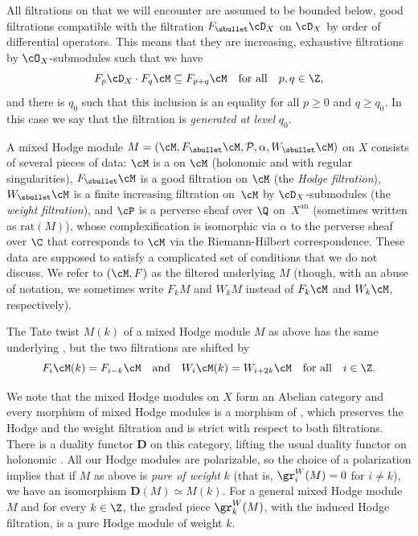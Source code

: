 All filtrations on \DXmodules that we will encounter are assumed to be bounded below, good filtrations compatible with the
filtration $F_{\sbullet}\cD_X$ on $\cD_X$ by order of differential operators. This means that they are increasing, exhaustive filtrations by $\cO_X$-submodules such that we have
\[F_p\cD_X\cdot F_q\cM\subseteq F_{p+q}\cM\quad\text{for all}\quad p,q\in\Z,\]
and there is $q_0$ such that this inclusion is an equality for all $p\geq 0$ and $q\geq q_0$. In this case we say that the filtration is \emph{generated at level} $q_0$.

A mixed Hodge module $M=(\cM, F_{\sbullet}\cM, {\mathcal P}, \alpha, W_{\sbullet}\cM)$ on $X$ consists of several pieces of data: $\cM$ is a \DXmodule on $\cM$ (holonomic and with regular singularities), $F_{\sbullet}\cM$ is a good filtration on $\cM$ (the \emph{Hodge filtration}), $W_{\sbullet}\cM$ is a finite increasing
filtration on~$\cM$ by $\cD_X$-submodules (the \emph{weight filtration}), and $\cP$
is a perverse sheaf over $\Q$ on~$X^\mathrm{an}$ (sometimes written as $\mathrm{rat}(M)$), whose complexification is isomorphic via $\alpha$ to the perverse sheaf over $\C$ that corresponds to $\cM$ via the
Riemann-Hilbert correspondence. These data are supposed to satisfy a complicated set of conditions that we do not discuss.
We refer to $(\cM,F)$ as the filtered \DXmodule underlying $M$ (though,
with an abuse of notation, we sometimes write $F_kM$ and $W_kM$ instead of $F_k\cM$ and $W_k\cM$, respectively).

The Tate twist $M(k)$ of a mixed Hodge module $M$ as above has the same underlying \DXmodule, but the two filtrations are shifted by
\[F_i\cM(k)=F_{i-k}\cM\quad\text{and}\quad W_i\cM(k)=W_{i+2k}\cM\quad\text{for all}\quad i\in\Z.\]

We note that the mixed Hodge modules on $X$ form an Abelian category and every morphism of mixed Hodge modules is a morphism of \DXmodules, which
preserves the Hodge and the weight filtration and is strict with respect to both filtrations.
There is a duality functor ${\mathbf D}$ on this category, lifting the usual duality functor on holonomic \DXmodules. All our Hodge
modules are polarizable, so the choice of a polarization implies that if $M$ as above is \emph{pure of weight} $k$ (that is, $\gr^W_i(M)=0$ for $i\neq k$), we have an isomorphism
${\mathbf D}(M)\simeq M(k)$. For a general mixed Hodge module $M$ and for every $k\in\Z$, the graded piece $\gr_k^W(M)$, with the induced Hodge filtration, is a pure
Hodge module of weight $k$.

